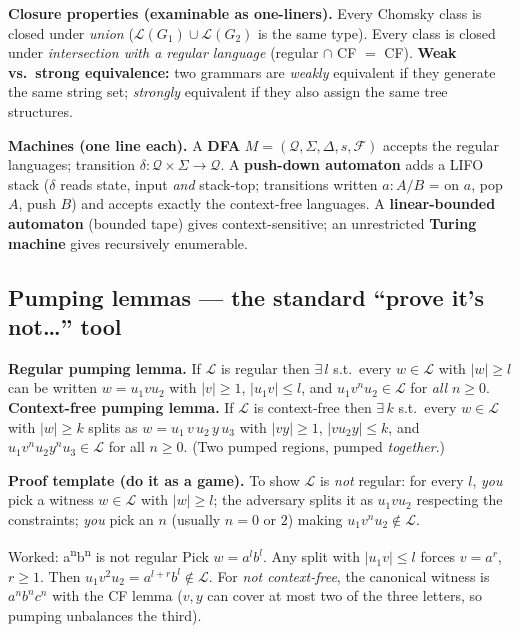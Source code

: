 \documentclass[11pt,a4paper]{article}
\begin{document}
\begin{useful}
\textbf{Closure properties (examinable as one-liners).} Every Chomsky class is closed under \emph{union} ($\mathcal L(G_1)\cup\mathcal L(G_2)$ is the same type). Every class is closed under \emph{intersection with a regular language} (regular $\cap$ CF $=$ CF). \textbf{Weak vs.\ strong equivalence:} two grammars are \emph{weakly} equivalent if they generate the same string set; \emph{strongly} equivalent if they also assign the same tree structures.
\end{useful}

\textbf{Machines (one line each).} A \textbf{DFA} $M=(\mathcal Q,\Sigma,\Delta,s,\mathcal F)$ accepts the regular languages; transition $\delta:\mathcal Q\times\Sigma\to\mathcal Q$. A \textbf{push-down automaton} adds a LIFO stack ($\delta$ reads state, input \emph{and} stack-top; transitions written $a:A/B$ = on $a$, pop $A$, push $B$) and accepts exactly the context-free languages. A \textbf{linear-bounded automaton} (bounded tape) gives context-sensitive; an unrestricted \textbf{Turing machine} gives recursively enumerable.

\subsection{Pumping lemmas --- the standard ``prove it's not\dots'' tool}

\begin{must}
\textbf{Regular pumping lemma.} If $\mathcal L$ is regular then $\exists\,l$ s.t.\ every $w\in\mathcal L$ with $|w|\ge l$ can be written $w=u_1vu_2$ with
$|v|\ge1$, $|u_1v|\le l$, and $u_1v^nu_2\in\mathcal L$ for \emph{all} $n\ge0$.\\[3pt]
\textbf{Context-free pumping lemma.} If $\mathcal L$ is context-free then $\exists\,k$ s.t.\ every $w\in\mathcal L$ with $|w|\ge k$ splits as $w=u_1\,v\,u_2\,y\,u_3$ with $|vy|\ge1$, $|vu_2y|\le k$, and $u_1v^n u_2 y^n u_3\in\mathcal L$ for all $n\ge0$. (Two pumped regions, pumped \emph{together}.)
\end{must}

\textbf{Proof template (do it as a game).} To show $\mathcal L$ is \emph{not} regular: for every $l$, \emph{you} pick a witness $w\in\mathcal L$ with $|w|\ge l$; the adversary splits it as $u_1vu_2$ respecting the constraints; \emph{you} pick an $n$ (usually $n=0$ or $2$) making $u_1v^nu_2\notin\mathcal L$.

\begin{plain}{Worked: a\textsuperscript{n}b\textsuperscript{n} is not regular}
Pick $w=a^l b^l$. Any split with $|u_1v|\le l$ forces $v=a^r$, $r\ge1$. Then $u_1v^2u_2=a^{l+r}b^{l}\notin\mathcal L$. \quad
For \emph{not context-free}, the canonical witness is $a^nb^nc^n$ with the CF lemma ($v,y$ can cover at most two of the three letters, so pumping unbalances the third).
\end{plain}
\end{document}
